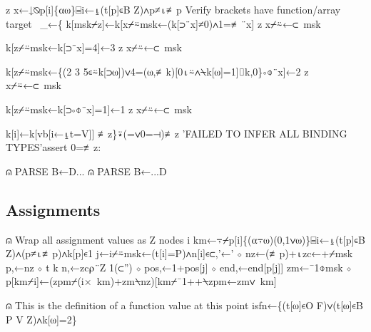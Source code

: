 \documentclass{article}%
\begin{document}
\nwenddocs{}\endmoddef\nwstartdeflinemarkup{}\nwenddeflinemarkup
z x←↓⍉p[i]\{⍺⍵\}⌸i←⍸(t[p]∊B Z)∧p≠⍳≢p
\LA{}Verify brackets have function/array target~{\nwtagstyle{}}\RA{}
_←\{
        k[msk⌿z]←k[x⌿⍨msk←(k[⊃¨x]≠0)∧1=≢¨x]
        z x⌿⍨←⊂~msk

        k[z⌿⍨msk←k[⊃¨x]=4]←3
        z x⌿⍨←⊂~msk

        k[z⌿⍨msk←\{(2 3 5∊⍨k[⊃⍵])∨4=(⍵,≢k)[0⍳⍨∧⍀k[⍵]=1]⌷k,0\}∘⌽¨x]←2
        z x⌿⍨←⊂~msk

        k[z⌿⍨msk←k[⊃∘⌽¨x]=1]←1
        z x⌿⍨←⊂~msk

        k[i]←k[vb[i←⍸t=V]]
≢z\}⍣(=∨0=⊣)≢z
'FAILED TO INFER ALL BINDING TYPES'assert 0=≢z:
\nwendcode{}\nwdocspar

\nwenddocs{}\endmoddef\nwstartdeflinemarkup{}\nwenddeflinemarkup
⍝ PARSE B←D...
⍝ PARSE B←...D
\nwendcode{}\nwdocspar

\subsection{Assignments}

\nwenddocs{}\endmoddef\nwstartdeflinemarkup{}\nwenddeflinemarkup
⍝ Wrap all assignment values as Z nodes
i km←⍪⌿p[i]\{(⍺⍪⍵)(0,1∨⍵)\}⌸i←⍸(t[p]∊B Z)∧(p≠⍳≢p)∧k[p]∊1
j←i⌿⍨msk←(t[i]=P)∧n[i]∊⊂,'←' ⋄ nz←(≢p)+⍳zc←+⌿msk
p,←nz ⋄ t k n,←zc⍴¨Z 1(⊂'') ⋄ pos,←1+pos[j] ⋄ end,←end[p[j]]
zm←¯1⌽msk ⋄ p[km⌿i]←(zpm⌿(i×~km)+zm⍀nz)[km⌿¯1++⍀zpm←zm∨~km]

⍝ This is the definition of a function value at this point
isfn←\{(t[⍵]∊O F)∨(t[⍵]∊B P V Z)∧k[⍵]=2\}
\end{document}
